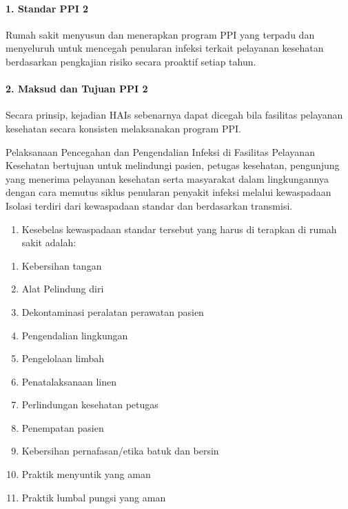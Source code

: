 \documentclass[
]{book}
\providecommand{\tightlist}{%
  \setlength{\itemsep}{0pt}\setlength{\parskip}{0pt}}
\begin{document}
\hypertarget{standar-ppi-2}{%
\paragraph*{1. Standar PPI 2}\label{standar-ppi-2}}

Rumah sakit menyusun dan menerapkan program PPI yang terpadu dan menyeluruh untuk mencegah penularan infeksi terkait pelayanan kesehatan berdasarkan pengkajian risiko secara proaktif setiap tahun.

\hypertarget{maksud-dan-tujuan-ppi-2}{%
\paragraph*{2. Maksud dan Tujuan PPI 2}\label{maksud-dan-tujuan-ppi-2}}

Secara prinsip, kejadian HAIs sebenarnya dapat dicegah bila fasilitas pelayanan kesehatan secara konsisten melaksanakan program PPI.

Pelaksanaan Pencegahan dan Pengendalian Infeksi di Fasilitas Pelayanan Kesehatan bertujuan untuk melindungi pasien, petugas kesehatan, pengunjung yang menerima pelayanan kesehatan serta masyarakat dalam lingkungannya dengan cara memutus siklus penularan penyakit infeksi melalui kewaspadaan Isolasi terdiri dari kewaspadaan standar dan berdasarkan transmisi.

\begin{enumerate}
\def\labelenumi{\alph{enumi}.}
\tightlist
\item
  Kesebelas kewaspadaan standar tersebut yang harus di terapkan di rumah sakit adalah:
\end{enumerate}

\begin{enumerate}
\def\labelenumi{\arabic{enumi}.}
\tightlist
\item
  Kebersihan tangan
\item
  Alat Pelindung diri
\item
  Dekontaminasi peralatan perawatan pasien
\item
  Pengendalian lingkungan
\item
  Pengelolaan limbah
\item
  Penatalaksanaan linen
\item
  Perlindungan kesehatan petugas
\item
  Penempatan pasien
\item
  Kebersihan pernafasan/etika batuk dan bersin
\item
  Praktik menyuntik yang aman
\item
  Praktik lumbal pungsi yang aman
\end{enumerate}
\end{document}
